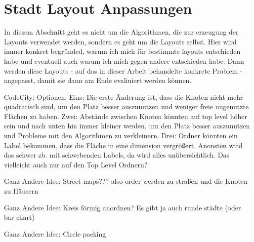 \section{Stadt Layout Anpassungen} \label{sec:SquarifyLayoutAnpassungen}

In diesem Abschnitt geht es nicht um die Algorithmen, die zur erzeugung der Layouts verwendet werden, sondern es geht um die Layouts selbst. Hier wird immer konkret begründed, warum ich mich für bestimmte layouts entschieden habe und eventuell auch warum ich mich gegen andere entschieden habe. Dann werden diese Layouts - auf das in dieser Arbeit behandelte konkrete Problem - angepasst, damit sie dann am Ende evaliuiert werden können.  

CodeCity:
Optionen:
Eins:
Die erste Änderung ist, dass die Knoten nicht mehr quadratisch sind, um den Platz besser auszunutzen und weniger freie ungenutzte Flächen zu haben.
Zwei:
Abstände zwischen Knoten könnten auf top level höher sein und nach unten hin immer kleiner werden, um den Platz besser auszunutzen und Probleme mit den Algorithmen zu verkleinern.
Drei:
Ordner könnten ein Label bekommen, dass die Fläche in eine dimension vergrößert. Anonsten wird das schwer zb. mit schwebenden Labels, da wird alles unübersichtlich. Das vielleicht auch nur auf den Top Level Ordnern?



Ganz Andere Idee:
Street maps???
also order werden zu straßen und die Knoten zu Häusern



Ganz Andere Idee:
Kreis förmig anordnen? Es gibt ja auch runde städte
(oder bar chart)




Ganz Andere Idee:
Circle packing

